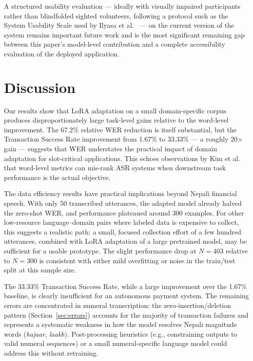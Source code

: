\documentclass[11pt,a4paper]{article}
\begin{document}
A structured usability evaluation --- ideally with visually impaired
participants rather than blindfolded sighted volunteers, following a
protocol such as the System Usability Scale used by Ilyasa et
al.~\cite{ilyasa2023} --- on the current version of the system remains
important future work and is the most significant remaining gap
between this paper's model-level contribution and a complete
accessibility evaluation of the deployed application.

\section{Discussion}
\label{sec:discussion}

Our results show that LoRA adaptation on a small domain-specific corpus
produces disproportionately large task-level gains relative to the
word-level improvement. The 67.2\% relative WER reduction is itself
substantial, but the Transaction Success Rate improvement from 1.67\% to
33.33\% --- a roughly 20$\times$ gain --- suggests that WER understates
the practical impact of domain adaptation for slot-critical applications.
This echoes observations by Kim et al.~\cite{kim2021semdist} that
word-level metrics can mis-rank ASR systems when downstream task
performance is the actual objective.

The data efficiency results have practical implications beyond Nepali
financial speech. With only 50 transcribed utterances, the adapted model
already halved the zero-shot WER, and performance plateaued around 300
examples. For other low-resource language--domain pairs where labeled data
is expensive to collect, this suggests a realistic path: a small, focused
collection effort of a few hundred utterances, combined with LoRA
adaptation of a large pretrained model, may be sufficient for a usable
prototype. The slight performance drop at $N=403$ relative to $N=300$ is
consistent with either mild overfitting or noise in the train/test split
at this sample size.

The 33.33\% Transaction Success Rate, while a large improvement over the
1.67\% baseline, is clearly insufficient for an autonomous payment system.
The remaining errors are concentrated in numeral transcription: the
zero-insertion/deletion pattern (Section~\ref{sec:errors}) accounts for
the majority of transaction failures and represents a systematic weakness
in how the model resolves Nepali magnitude words (\textit{hajaar},
\textit{laakh}). Post-processing heuristics (e.g., constraining outputs
to valid numeral sequences) or a small numeral-specific language model
could address this without retraining.
\end{document}
